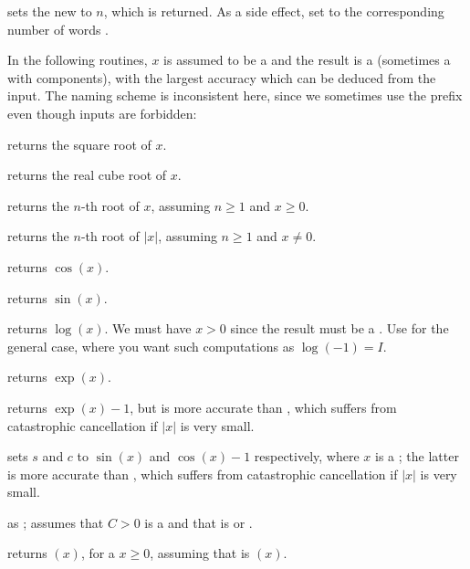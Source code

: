  sets the new
 to $n$, which is returned. As a side effect, set
 to the corresponding number of words .


In the following routines, $x$ is assumed to be a  and the result
is a  (sometimes a  with  components), with
the largest accuracy which can be deduced from the input. The naming scheme
is inconsistent here, since we sometimes use the prefix  even though
 inputs are forbidden:

 returns the square root of $x$.

 returns the real cube root of $x$.

 returns the $n$-th root of $x$, assuming
$n\geq 1$ and $x \geq 0$.

 returns the $n$-th root of $|x|$,
assuming $n\geq 1$ and $x \neq 0$.

 returns $\cos(x)$.

 returns $\sin(x)$.

 returns $\log(x)$. We must have $x > 0$
since the result must be a . Use  for the general case,
where you want such computations as $\log(-1) = I$.

 returns $\exp(x)$.

 returns $\exp(x)-1$, but is more accurate than
, which suffers from catastrophic cancellation if
$|x|$ is very small.

 sets $s$ and $c$ to
$\sin(x)$ and $\cos(x)-1$ respectively, where $x$ is a ; the latter
is more accurate than , which suffers from
catastrophic cancellation if $|x|$ is very small.

 as ; assumes
that $C > 0$ is a  and that  is  or .

 returns $(x)$, for a 
$x\geq 0$, assuming that  is $(x)$.


